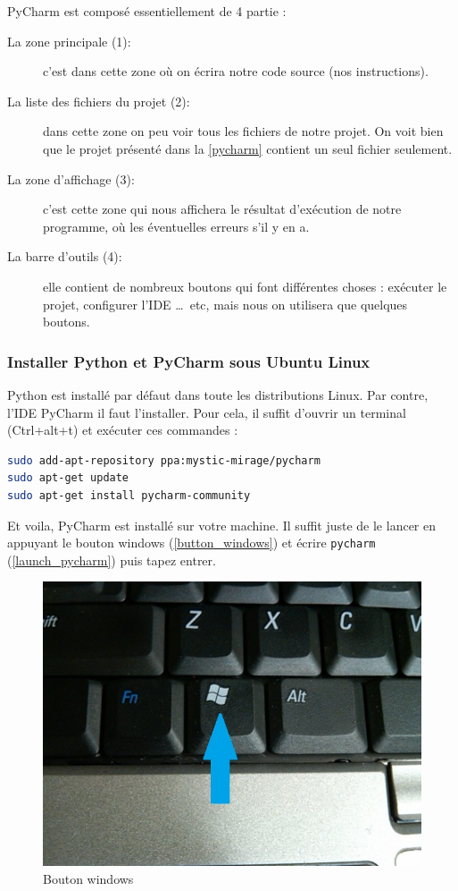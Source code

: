 \documentclass[12pt]{article}
\newcommand{\code}[1]{\colorbox{light-gray}{\texttt{#1}}}
\begin{document}
        PyCharm est composé essentiellement de 4 partie :
        \begin{description}
            \item[La zone principale (1):] c'est dans cette zone où on écrira notre code source (nos instructions).
            \item[La liste des fichiers du projet (2):] dans cette zone on peu voir tous les fichiers de notre projet.
                On voit bien que le projet présenté dans la \autoref{pycharm} contient un seul fichier seulement.
            \item[La zone d'affichage (3):] c'est cette zone qui nous affichera le résultat d'exécution de notre
                programme, où les éventuelles erreurs s'il y en a.
            \item[La barre d'outils (4):] elle contient de nombreux boutons qui font différentes choses : exécuter
            le projet, configurer l'IDE \ldots\ etc, mais nous on utilisera que quelques boutons.
        \end{description}

        \subsubsection{Installer Python et PyCharm sous Ubuntu Linux}
            Python est installé par défaut dans toute les distributions Linux. Par contre, l'IDE PyCharm il
            faut l'installer. Pour cela, il suffit d'ouvrir un terminal (Ctrl+alt+t) et exécuter ces commandes :
            \begin{lstlisting}[language=bash, style=code, numbers=none]
sudo add-apt-repository ppa:mystic-mirage/pycharm
sudo apt-get update
sudo apt-get install pycharm-community
            \end{lstlisting}

            Et voila, PyCharm est installé sur votre machine. Il suffit juste de le lancer en appuyant le bouton
            windows (\autoref{button_windows}) et écrire \code{pycharm} (\autoref{launch_pycharm}) puis tapez entrer.

            \begin{figure}[H]
                \centering
                \includegraphics[width=0.5\linewidth]{img/8_windows_button.jpg}
                \caption{Bouton windows}
                \label{button_windows}
            \end{figure}
\end{document}
